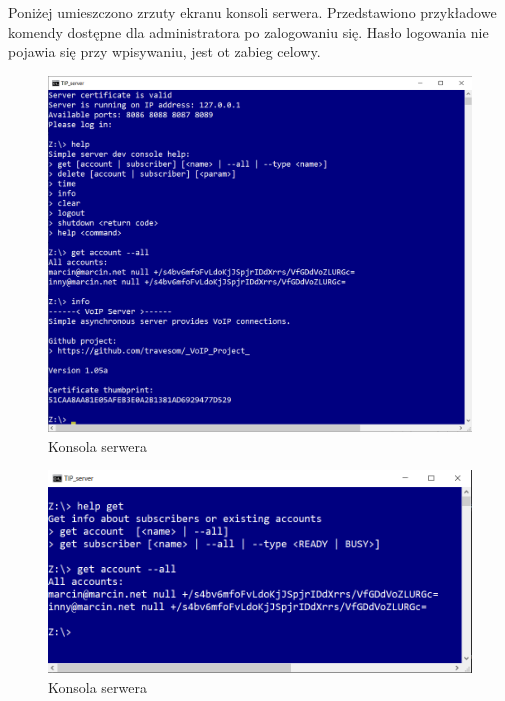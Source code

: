 \documentclass[12pt,a4paper]{article}
\begin{document}
	\par Poniżej umieszczono zrzuty ekranu konsoli serwera. Przedstawiono przykładowe komendy dostępne dla administratora po zalogowaniu się. Hasło logowania nie pojawia się przy wpisywaniu, jest ot zabieg celowy.
	\begin{figure}[h!]
		\begin{center}
			\includegraphics*[width=.9\textwidth]{serwer_1.png}
		\end{center}
		\caption{Konsola serwera}
	\end{figure}
	
	\pagebreak
	\begin{figure}[h!]
		\begin{center}
			\includegraphics*[width=.8\textwidth]{serwer_2.png}
		\end{center}
		\caption{Konsola serwera}
	\end{figure}
	
\end{document}
